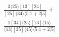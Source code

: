 \documentclass[varwidth, border=5pt]{standalone}
\begin{document}
\begin{my}
$\begin{gathered}
\scriptscriptstyle\frac{3⟨25⟩[13][24]}{[25]⟨34⟩⟨5|1+2|5]}+\\
\scriptscriptstyle\frac{1[34]⟨25⟩[13]⟨15⟩}{⟨13⟩[35]⟨45⟩⟨5|1+2|5]}\phantom{+}
\end{gathered}$
\end{my}
\end{document}
